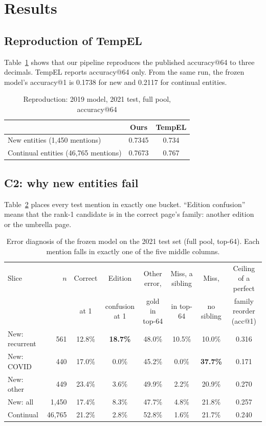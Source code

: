 \documentclass[conference]{IEEEtran}
\begin{document}
\section{Results}

\subsection{Reproduction of TempEL}

Table~\ref{tab:repro} shows that our pipeline reproduces the published accuracy@64 to three decimals.
TempEL reports accuracy@64 only. From the same run, the frozen model's accuracy@1 is 0.1738 for new
and 0.2117 for continual entities.

\begin{table}[t]
\caption{Reproduction: 2019 model, 2021 test, full pool, accuracy@64}
\label{tab:repro}
\centering
\begin{tabular}{lcc}
\toprule
 & Ours & TempEL \cite{tempel} \\
\midrule
New entities (1,450 mentions) & 0.7345 & 0.734 \\
Continual entities (46,765 mentions) & 0.7673 & 0.767 \\
\bottomrule
\end{tabular}
\end{table}

\subsection{C2: why new entities fail}
\label{sec:diag}

Table~\ref{tab:diag} places every test mention in exactly one bucket. ``Edition confusion'' means that
the rank-1 candidate is in the correct page's family: another edition or the umbrella page.

\begin{table}[t]
\caption{Error diagnosis of the frozen model on the 2021 test set (full pool, top-64). Each mention falls in exactly one of the five middle columns.}
\label{tab:diag}
\centering
\begin{tabular}{lrcccccc}
\toprule
Slice & $n$ & Correct & Edition & Other error, & Miss, a sibling & Miss, & Ceiling of a perfect \\
 & & at 1 & confusion at 1 & gold in top-64 & in top-64 & no sibling & family reorder (acc@1) \\
\midrule
New: recurrent & 561 & 12.8\% & \textbf{18.7\%} & 48.0\% & 10.5\% & 10.0\% & 0.316 \\
New: COVID & 440 & 17.0\% & 0.0\% & 45.2\% & 0.0\% & \textbf{37.7\%} & 0.171 \\
New: other & 449 & 23.4\% & 3.6\% & 49.9\% & 2.2\% & 20.9\% & 0.270 \\
New: all & 1,450 & 17.4\% & 8.3\% & 47.7\% & 4.8\% & 21.8\% & 0.257 \\
Continual & 46,765 & 21.2\% & 2.8\% & 52.8\% & 1.6\% & 21.7\% & 0.240 \\
\bottomrule
\end{tabular}
\end{table}
\end{document}
